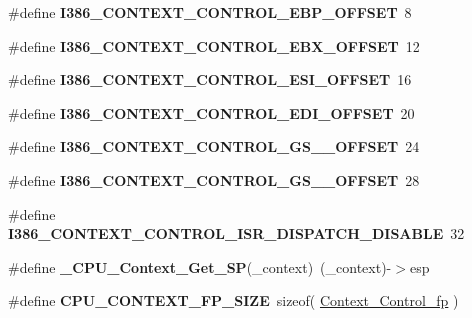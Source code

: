 \begin{DoxyCompactItemize}
\#define {\bfseries I386\+\_\+\+C\+O\+N\+T\+E\+X\+T\+\_\+\+C\+O\+N\+T\+R\+O\+L\+\_\+\+E\+B\+P\+\_\+\+O\+F\+F\+S\+ET}~8
\item 
\mbox{\label{group__RTEMSScoreCPUi386_ga4c638f16a1fc529e987a7d9f6b7d26e4}} 
\#define {\bfseries I386\+\_\+\+C\+O\+N\+T\+E\+X\+T\+\_\+\+C\+O\+N\+T\+R\+O\+L\+\_\+\+E\+B\+X\+\_\+\+O\+F\+F\+S\+ET}~12
\item 
\mbox{\label{group__RTEMSScoreCPUi386_ga5ca4c47258d2c244e9cdcf0e2d456bdb}} 
\#define {\bfseries I386\+\_\+\+C\+O\+N\+T\+E\+X\+T\+\_\+\+C\+O\+N\+T\+R\+O\+L\+\_\+\+E\+S\+I\+\_\+\+O\+F\+F\+S\+ET}~16
\item 
\mbox{\label{group__RTEMSScoreCPUi386_ga3f0e964e45a651bafb24e069378ec1b5}} 
\#define {\bfseries I386\+\_\+\+C\+O\+N\+T\+E\+X\+T\+\_\+\+C\+O\+N\+T\+R\+O\+L\+\_\+\+E\+D\+I\+\_\+\+O\+F\+F\+S\+ET}~20
\item 
\mbox{\label{group__RTEMSScoreCPUi386_gad8fd2d2f0a8616906a52b10fcb8d190d}} 
\#define {\bfseries I386\+\_\+\+C\+O\+N\+T\+E\+X\+T\+\_\+\+C\+O\+N\+T\+R\+O\+L\+\_\+\+G\+S\+\_\+\_\+\+O\+F\+F\+S\+ET}~24
\item 
\mbox{\label{group__RTEMSScoreCPUi386_gaa102d4f14b2b0df8968d521dec414b70}} 
\#define {\bfseries I386\+\_\+\+C\+O\+N\+T\+E\+X\+T\+\_\+\+C\+O\+N\+T\+R\+O\+L\+\_\+\+G\+S\+\_\+\_\+\+O\+F\+F\+S\+ET}~28
\item 
\mbox{\label{group__RTEMSScoreCPUi386_ga43279fec0f96c24c5830dd7a5d35c63f}} 
\#define {\bfseries I386\+\_\+\+C\+O\+N\+T\+E\+X\+T\+\_\+\+C\+O\+N\+T\+R\+O\+L\+\_\+\+I\+S\+R\+\_\+\+D\+I\+S\+P\+A\+T\+C\+H\+\_\+\+D\+I\+S\+A\+B\+LE}~32
\item 
\mbox{\label{group__RTEMSScoreCPUi386_ga896055157b72692a6141f7c0039eabdf}} 
\#define {\bfseries \+\_\+\+C\+P\+U\+\_\+\+Context\+\_\+\+Get\+\_\+\+SP}(\+\_\+context)~(\+\_\+context)-\/$>$esp
\item 
\mbox{\label{group__RTEMSScoreCPUi386_gaf58e4ff1f7e1c85fc5c0b80cbd0672c5}} 
\#define {\bfseries C\+P\+U\+\_\+\+C\+O\+N\+T\+E\+X\+T\+\_\+\+F\+P\+\_\+\+S\+I\+ZE}~sizeof( \mbox{\hyperlink{structContext__Control__fp}{Context\+\_\+\+Control\+\_\+fp}} )

\end{DoxyCompactItemize}
